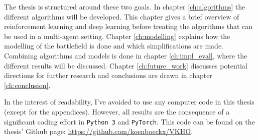 The thesis is structured around these two goals. In chapter \ref{ch:algorithms} the different algorithms will be developed. This chapter gives a brief overview of reinforcement learning and deep learning before treating the algorithms that can be used in a multi-agent setting. Chapter \ref{ch:modelling} explains how the modelling of the battlefield is done and which simplifications are made. Combining algorithms and models is done in chapter \ref{ch:impl_eval}, where the different results will be discussed. Chapter \ref{ch:future_work} discusses potential directions for further research and conclusions are drawn in chapter \ref{ch:conclusion}.

In the interest of readability, I've avoided to use any computer code in this thesis (except for the appendices). However, all results are the consequence of a significant coding effort in {\tt Python 3} and {\tt PyTorch}. This code can be found on the thesis' Github page: \url{https://github.com/koenboeckx/VKHO}.

%
%
%

